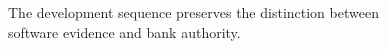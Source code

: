 \begin{figure}[H]
\centering
{}
\caption{The development sequence preserves the distinction between software evidence and bank authority.}\label{fig:teach-M10-14}
\end{figure}
